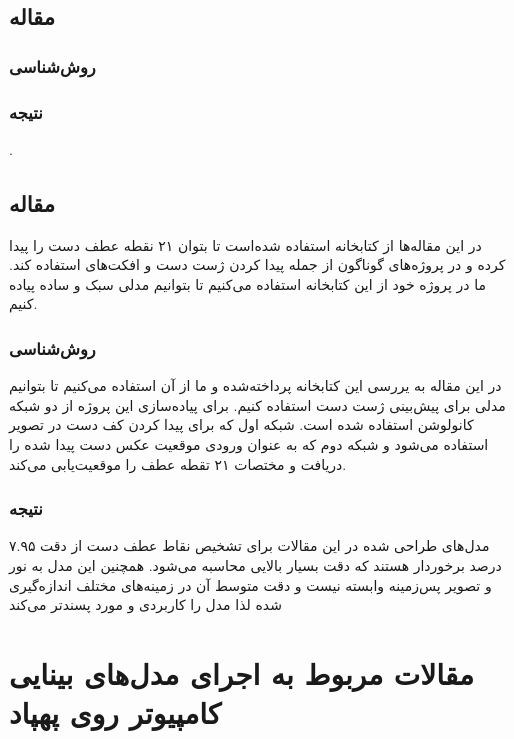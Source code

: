 \subsection{مقاله }

\subsubsection{روش‌شناسی}

\subsubsection{نتیجه}
\cite{chen2021visual}.


\subsection{مقاله }
در این مقاله‌ها از کتابخانه  استفاده‌ شده‌است تا بتوان ۲۱ نقطه عطف دست را پیدا کرده و در پروژه‌های گوناگون از جمله پیدا کردن ژست دست و افکت‌های  استفاده کند. ما در پروژه خود از این کتابخانه استفاده می‌کنیم تا بتوانیم مدلی سبک و ساده پیاده کنیم.

\subsubsection{روش‌شناسی}
 در این مقاله به یررسی این کتابخانه پرداخته‌شده و ما از آن استفاده می‌کنیم تا بتوانیم مدلی برای پیش‌بینی ژست دست استفاده کنیم.
برای پیاده‌سازی این پروژه از دو شبکه کانولوشن استفاده شده است. شبکه اول که برای پیدا کردن کف دست در تصویر استفاده می‌شود و شبکه دوم که به عنوان ورودی موقعیت عکس دست پیدا شده را دریافت و مختصات ۲۱ تقطه عطف را موقعیت‌یابی می‌کند.

\subsubsection{نتیجه}
مدل‌های طراحی شده در این مقالات برای تشخیص نقاط عطف دست از دقت ۷.۹۵ درصد برخوردار هستند که دقت بسیار بالایی محاسبه می‌شود. همچنین این مدل به نور و تصویر پس‌زمینه وابسته نیست و دقت متوسط آن در زمینه‌های مختلف اندازه‌گیری شده لذا مدل را کاربردی‌ و مورد پسندتر می‌کند
\cite{zhang2020mediapipe} 







\section{مقالات مربوط به اجرای مدل‌های بینایی کامپیوتر روی پهپاد}
